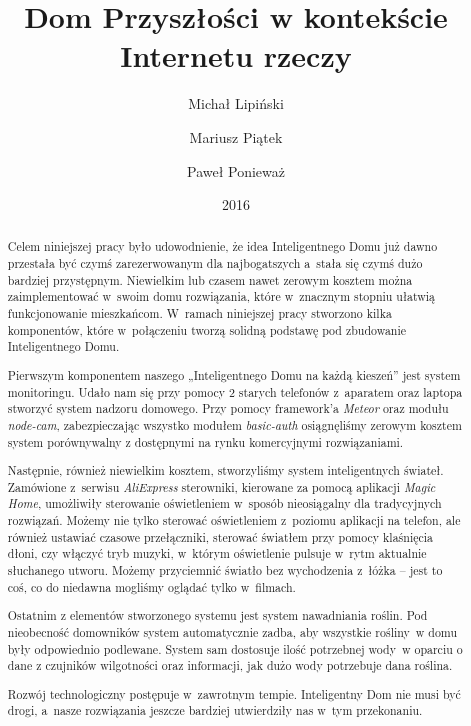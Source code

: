 \documentclass{xmgr}
\author   {Michał Lipiński}
\author   {Mariusz Piątek}
\author   {Paweł Ponieważ}
\title    {Dom Przyszłości w kontekście Internetu rzeczy}
\date     {2016}
\begin{document}
\begin{abstract}
	Celem niniejszej pracy było udowodnienie, że idea Inteligentnego Domu już dawno przestała być czymś zarezerwowanym dla najbogatszych a~stała się czymś dużo bardziej przystępnym. Niewielkim lub czasem nawet zerowym kosztem można zaimplementować w~swoim domu rozwiązania, które w~znacznym stopniu ułatwią funkcjonowanie mieszkańcom. W~ramach niniejszej pracy stworzono kilka komponentów, które w~połączeniu tworzą solidną podstawę pod zbudowanie Inteligentnego Domu.
	
	Pierwszym komponentem naszego „Inteligentnego Domu na każdą kieszeń” jest system monitoringu. Udało nam się przy pomocy 2 starych telefonów z~aparatem oraz laptopa stworzyć system nadzoru domowego. Przy pomocy framework'a \emph{Meteor} oraz modułu \emph{node-cam}, zabezpieczając wszystko modułem \emph{basic-auth} osiągnęliśmy zerowym kosztem system porównywalny z dostępnymi na rynku komercyjnymi rozwiązaniami.
	
	Następnie, również niewielkim kosztem, stworzyliśmy system inteligentnych świateł. Zamówione z~serwisu \emph{AliExpress} sterowniki, kierowane za pomocą aplikacji \emph{Magic Home}, umożliwiły sterowanie oświetleniem w~sposób nieosiągalny dla tradycyjnych rozwiązań. Możemy nie tylko sterować oświetleniem z~poziomu aplikacji na telefon, ale również ustawiać czasowe przełączniki, sterować światłem przy pomocy klaśnięcia dłoni, czy włączyć tryb muzyki, w~którym oświetlenie pulsuje w~rytm aktualnie słuchanego utworu. Możemy przyciemnić światło bez wychodzenia z~łóżka – jest to coś, co do niedawna mogliśmy oglądać tylko w~filmach.
	
	Ostatnim z elementów stworzonego systemu jest system nawadniania roślin. Pod nieobecność domowników system automatycznie zadba, aby wszystkie rośliny~w domu były odpowiednio podlewane. System sam dostosuje ilość potrzebnej wody~w oparciu o dane z czujników wilgotności oraz informacji, jak dużo wody potrzebuje dana roślina.
	
	Rozwój technologiczny postępuje w~zawrotnym tempie. Inteligentny Dom nie musi być drogi, a~nasze rozwiązania jeszcze bardziej utwierdziły nas w~tym przekonaniu.
\end{abstract}
\clearpage
\end{document}
